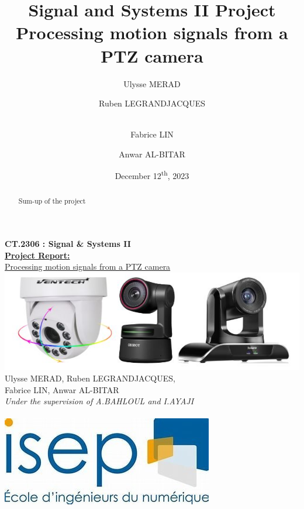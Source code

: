 \documentclass[a4paper,12pt]{article}
\title{Signal and Systems II Project \\ [1ex]\large Processing motion signals from a PTZ camera  }
\author{Ulysse MERAD\and Ruben LEGRANDJACQUES \and \\Fabrice LIN \and Anwar AL-BITAR}
\date{December 12\textsuperscript{th}, 2023}
\begin{document}
\begin{titlepage}
  \centering
  \vspace{3cm}
  \Huge{\color{blue}\textbf{CT.2306 : Signal  \& Systems II }}\\
  \vspace{1cm}
  \Huge{\underline{\textbf{Project Report:}}}\\
  \vspace{0.5cm}
  \Large{ \underline{Processing motion signals from a PTZ camera}} \\
  \vspace{1cm}
  \includegraphics[scale=1]{camera.jpg}\\
  \vspace{0.5cm}
  Ulysse MERAD, Ruben LEGRANDJACQUES, \\ [0.5ex] Fabrice LIN, Anwar AL-BITAR \\
  \vspace{1.5cm}
  \large{\textit {Under the supervision of A.BAHLOUL and I.AYAJI}} \\
  \vspace{1.5cm}
  \thedate \\
  \vspace{2cm}
  \includegraphics[scale=0.7]{Isep.jpg}\\
  
\end{titlepage}

\begin{abstract}
  Sum-up of the project
\end{abstract}

\tableofcontents
\setlength{\parskip}{10pt}

\newpage
\end{document}
